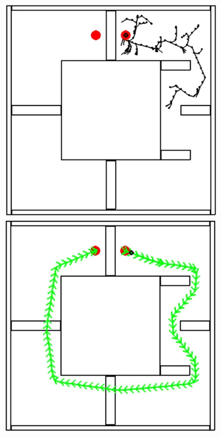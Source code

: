 \begin{figure}[!htb]
    \centering
    \begin{minipage}[b]{.3\linewidth}
        \centering
        \includegraphics[width=0.8\linewidth]{Figures/07_simulation/basic/00basic.png}
    \end{minipage}%
    \hfill%
    \begin{minipage}[b]{.3\linewidth}
        \centering
        \includegraphics[width=0.8\linewidth]{Figures/07_simulation/basic/01basic.png}
    \end{minipage}%
    \hfill%
    \begin{minipage}[b]{.3\linewidth}

\end{minipage}
\end{figure}
